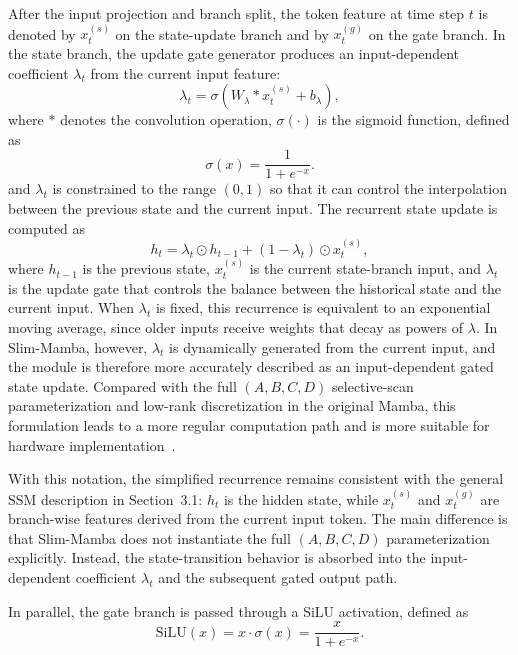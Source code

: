 \documentclass[11pt,twoside]{eitExjobb}
\begin{document}
After the input projection and branch split, the token feature at time step $t$ is
denoted by $x_t^{(s)}$ on the state-update branch and by $x_t^{(g)}$ on the gate
branch. In the state branch, the update gate generator produces an input-dependent
coefficient $\lambda_t$ from the current input feature:
\begin{equation}
\lambda_t = \sigma(W_{\lambda} * x_t^{(s)} + b_{\lambda}),
\label{eq:slim_mamba_lambda_conv}
\end{equation}
where $*$ denotes the convolution operation, $\sigma(\cdot)$ is the sigmoid function, defined as
\begin{equation}
\sigma(x) = \frac{1}{1+e^{-x}}.
\label{eq:sigmoid_function}
\end{equation}
and $\lambda_t$ is constrained to the range $(0,1)$ so that it can control the
interpolation between the previous state and the current input. The recurrent state
update is computed as
\begin{equation}
h_t = \lambda_t \odot h_{t-1} + (1-\lambda_t) \odot x_t^{(s)},
\label{eq:slim_mamba_state_update}
\end{equation}
where $h_{t-1}$ is the previous state, $x_t^{(s)}$ is the current state-branch input, and
$\lambda_t$ is the update gate that controls the balance between the historical state
and the current input. When $\lambda_t$ is fixed, this recurrence is equivalent to an
exponential moving average, since older inputs receive weights that decay as powers of
$\lambda$. In Slim-Mamba, however, $\lambda_t$ is dynamically generated from the
current input, and the module is therefore more accurately described as an
input-dependent gated state update. Compared with the full $(A,B,C,D)$ selective-scan
parameterization and low-rank discretization in the original Mamba, this formulation
leads to a more regular computation path and is more suitable for hardware
implementation~\cite{cite:Mamba2023}.

With this notation, the simplified recurrence remains consistent with the general SSM
description in Section~3.1: $h_t$ is the hidden state, while $x_t^{(s)}$ and
$x_t^{(g)}$ are branch-wise features derived from the current input token. The main
difference is that Slim-Mamba does not instantiate the full $(A,B,C,D)$
parameterization explicitly. Instead, the state-transition behavior is absorbed into
the input-dependent coefficient $\lambda_t$ and the subsequent gated output path.

In parallel, the gate branch is passed through a SiLU activation, defined as
\begin{equation}
\mathrm{SiLU}(x) = x \cdot \sigma(x) = \frac{x}{1+e^{-x}}.
\label{eq:silu_function}
\end{equation} 
\end{document}

